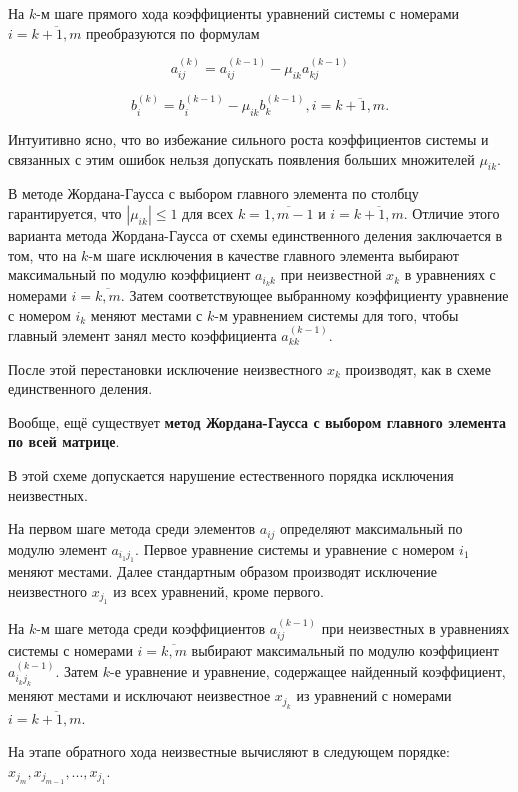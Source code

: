 \documentclass[__main__.tex]{subfiles}
\begin{document}
На $k$-м шаге прямого хода коэффициенты уравнений системы с номерами $i = \overline{k+1,m}$ преобразуются по формулам

$$a^{(k)}_{i j} = a^{(k-1)}_{i j} - \mu_{i k} a^{(k-1)}_{k j}$$

$$b_i^{(k)} = b_i^{(k-1)} - \mu_{i k} b_k^{(k-1)}, i = \overline{k+1,m}.$$

Интуитивно ясно, что во избежание сильного роста коэффициентов системы и связанных с этим ошибок нельзя допускать появления больших множителей $\mu_{i k}$.

В методе Жордана-Гаусса с выбором главного элемента по столбцу гарантируется, что $|\mu_{i k}| \leqslant 1$ для всех $k = \overline{1, m-1}$ и $i = \overline{k+1,m}$. Отличие этого варианта метода Жордана-Гаусса от схемы единственного деления заключается в том, что на $k$-м шаге исключения в качестве главного элемента выбирают максимальный по модулю коэффициент $a_{i_k k}$ при неизвестной $x_k$ в уравнениях с номерами $i = \overline{k,m}$. Затем соответствующее выбранному коэффициенту уравнение с номером $i_k$ меняют местами с $k$-м уравнением системы для того, чтобы главный элемент занял место коэффициента $a_{kk}^{(k-1)}$.

После этой перестановки исключение неизвестного $x_k$ производят, как в схеме единственного деления.

Вообще, ещё существует \textbf{метод Жордана-Гаусса с выбором главного элемента по всей матрице}.

В этой схеме допускается нарушение естественного порядка исключения неизвестных.

На первом шаге метода среди элементов $a_{i j}$ определяют максимальный по модулю элемент $a_{i_1 j_1}$. Первое уравнение системы и уравнение с номером $i_1$ меняют местами. Далее стандартным образом производят исключение неизвестного $x_{j_1}$ из всех уравнений, кроме первого.

На $k$-м шаге метода среди коэффициентов $a_{ij}^{(k-1)}$ при неизвестных в уравнениях системы с номерами $i = \overline{k,m}$ выбирают максимальный по модулю коэффициент $a_{i_k j_k}^{(k-1)}$. Затем $k$-е уравнение и уравнение, содержащее найденный коэффициент, меняют местами и исключают неизвестное $x_{j_k}$ из уравнений с номерами $i = \overline{k+1,m}$.

На этапе обратного хода неизвестные вычисляют в следующем порядке: $x_{j_m}, x_{j_{m-1}}, ..., x_{j_1}$.
\end{document}

